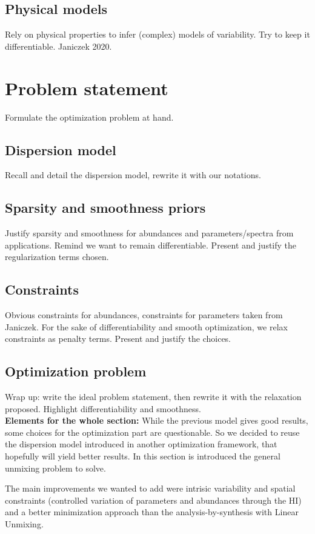 \documentclass[conference]{IEEEtran}
\begin{document}
\subsection{Physical models}
Rely on physical properties to infer (complex) models of variability. Try to keep it differentiable. Janiczek 2020.


\section{Problem statement}
Formulate the optimization problem at hand.

\subsection{Dispersion model}
Recall and detail the dispersion model, rewrite it with our notations.

\subsection{Sparsity and smoothness priors}
Justify sparsity and smoothness for abundances and parameters/spectra from applications. Remind we want to remain differentiable. Present and justify the regularization terms chosen.

\subsection{Constraints}
Obvious constraints for abundances, constraints for parameters taken from Janiczek. For the sake of differentiability and smooth optimization, we relax constraints as penalty terms. Present and justify the choices.

\subsection{Optimization problem}
Wrap up: write the ideal problem statement, then rewrite it with the relaxation proposed. Highlight differentiability and smoothness.\\

\textbf{Elements for the whole section:} While the previous model gives good results, some choices for the optimization part are questionable. So we decided to reuse the dispersion model introduced in another optimization framework, that hopefully will yield better results. In this section is introduced the general unmixing problem to solve.

The main improvements we wanted to add were intrisic variability and spatial constraints (controlled variation of parameters and abundances through the HI) and a better minimization approach than the analysis-by-synthesis with Linear Unmixing.
\end{document}
